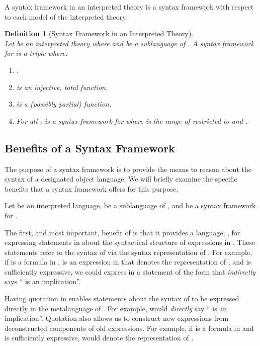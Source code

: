 \documentclass[11pt,fleqn]{article}
\newcommand{\be}{\begin{enumerate}}
\newcommand{\ee}{\end{enumerate}}
\newcommand{\bsp}{\begin{sloppypar}}
\newcommand{\esp}{\end{sloppypar}}
\newtheorem{df}[thm]{Definition}
\begin{document}
A syntax framework in an interpreted theory is a syntax framework with
respect to each model of the interpreted theory:

\begin{df}[Syntax Framework in an Interpreted Theory] \label{df:syn-frame-thy} \em
\hspace{2ex}\\
Let  be an interpreted theory where  and
 be a sublanguage of .  A \emph{syntax framework} for
 is a triple  where:

\be

  \item .

  \item  is an injective, total
    function.

  \item  is a (possibly partial)
    function.

  \item For all ,
     is a
    syntax framework for  where  is the range of 
    restricted to  and .\hfill 

\ee 
\end{df}

\subsection{Benefits of a Syntax Framework}

The purpose of a syntax framework is to provide the means to reason
about the syntax of a designated object language.  We will briefly
examine the specific benefits that a syntax framework offers for this
purpose.

Let  be an interpreted language,
 be a sublanguage of , and  be a syntax framework for .

The first, and most important, benefit of  is that it provides a
language, , for expressing statements in  about the
syntactical structure of expressions in .  These
statements refer to the syntax of  via the syntax
representation of .  For example, if  is a formula in ,  is an expression in  that denotes the
representation of , and  is sufficiently expressive, we could
express in  a statement of the form 
that \emph{indirectly} says `` is an implication''.

\bsp Having quotation in  enables statements about the syntax of
 to be expressed directly in the metalanguage of .
For example,  would \emph{directly} say
`` is an implication''.  Quotation also allows us to construct new
expressions from deconstructed components of old expressions.  For
example, if  is a formula in  and  is
sufficiently expressive,
 would denote the
representation of . \esp
\end{document}
